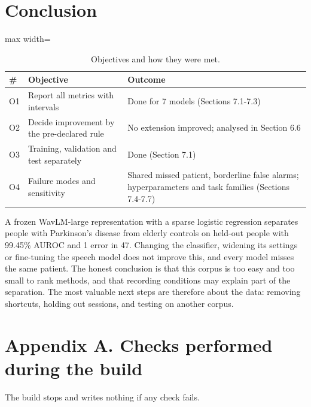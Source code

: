 \documentclass[11pt,a4paper]{article}
\begin{document}
\section{Conclusion}\label{sec:conclusion}
\begin{table}[H]\centering\footnotesize\renewcommand{\arraystretch}{1.15}
\caption{Objectives and how they were met.}
\begin{adjustbox}{max width=\linewidth}\begin{tabular}{lp{6cm}p{8.4cm}}
\toprule
\textbf{\#} & \textbf{Objective} & \textbf{Outcome}\\
\midrule
O1 & Report all metrics with intervals & Done for 7 models (Sections 7.1-7.3)\\
O2 & Decide improvement by the pre-declared rule & No extension improved; analysed in Section 6.6\\
O3 & Training, validation and test separately & Done (Section 7.1)\\
O4 & Failure modes and sensitivity & Shared missed patient, borderline false alarms; hyperparameters and task families (Sections 7.4-7.7)\\
\bottomrule
\end{tabular}\end{adjustbox}\end{table}
A frozen WavLM-large representation with a sparse logistic regression separates people with Parkinson's disease from elderly controls on held-out people with 99.45\% AUROC and 1 error in 47. Changing the classifier, widening its settings or fine-tuning the speech model does not improve this, and every model misses the same patient. The honest conclusion is that this corpus is too easy and too small to rank methods, and that recording conditions may explain part of the separation. The most valuable next steps are therefore about the data: removing shortcuts, holding out sessions, and testing on another corpus.

\section*{Appendix A. Checks performed during the build}
The build stops and writes nothing if any check fails.
\end{document}
